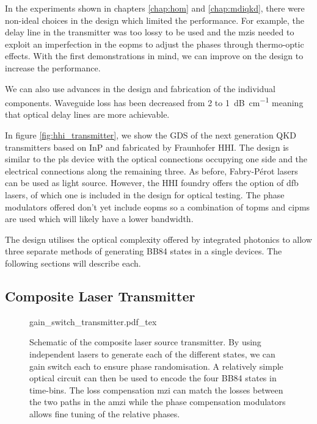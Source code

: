 In the experiments shown in chapters \ref{chap:hom} and \ref{chap:mdiqkd}, there were non-ideal choices in the design which limited the performance. For example, the delay line in the transmitter was too lossy to be used and the \acp{mzi} needed to exploit an imperfection in the \acp{eopm} to adjust the phases through thermo-optic effects. With the first demonstrations in mind, we can improve on the design to increase the performance.

We can also use advances in the design and fabrication of the individual components. Waveguide loss has been decreased from \num{2} to \SI{1}{dB\per\cm} meaning that optical delay lines are more achievable. 



In figure \ref{fig:hhi_transmitter}, we show the GDS of the next generation \ac{QKD} transmitters based on \ac{InP} and fabricated by Fraunhofer HHI. The design is similar to the \ac{pls} device with the optical connections occupying one side and the electrical connections along the remaining three. As before, Fabry-P\'{e}rot lasers can be used as light source. However, the HHI foundry offers the option of \ac{dfb} lasers, of which one is included in the design for optical testing. The phase modulators offered don't yet include \acp{eopm} so a combination of \acp{topm} and \acp{cipm} are used which will likely have a lower bandwidth.

The design utilises the optical complexity offered by integrated photonics to allow three separate methods of generating BB84 states in a single devices. The following sections will describe each.

\subsection{Composite Laser Transmitter}

\begin{figure}[t]
	\centering
	\def\svgwidth{\textwidth}
	{gain_switch_transmitter.pdf_tex}
		\caption[Schematic of the composite laser source transmitter]{Schematic of the composite laser source transmitter. By using independent lasers to generate each of the different states, we can gain switch each to ensure phase randomisation. A relatively simple optical circuit can then be used to encode the four BB84 states in time-bins. The loss compensation \ac{mzi} can match the losses between the two paths in the \ac{amzi} while the phase compensation modulators allows fine tuning of the relative phases.}
	\label{fig:multiple_lasers_tx}
\end{figure}

